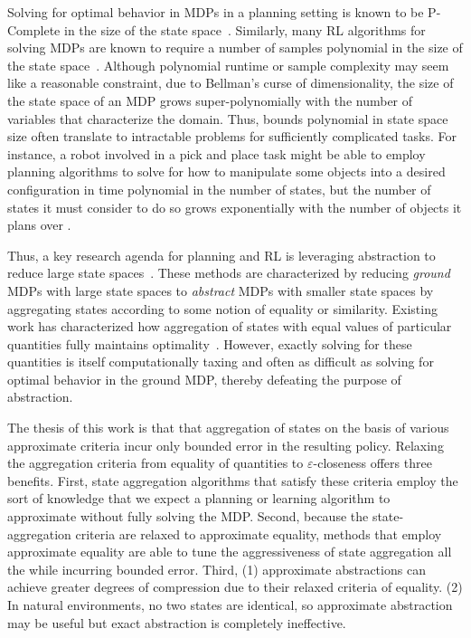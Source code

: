Solving for optimal behavior in \acp{MDP} in a planning setting is known to be P-Complete in the size of the state space~\cite{papadimitriou1987complexity,littman1995complexity}. Similarly, many \ac{RL} algorithms for solving \acp{MDP} are known to require a number of samples polynomial in the size of the state space~\cite{strehl2009reinforcement}. Although polynomial runtime or sample complexity may seem like a reasonable constraint, due to Bellman's curse of dimensionality, the size of the state space of an \ac{MDP} grows super-polynomially with the number of variables that characterize the domain. Thus, bounds polynomial in state space size often translate to intractable problems for sufficiently complicated tasks.  For instance, a robot involved in a pick and place task might be able to employ planning algorithms to solve for how to manipulate some objects into a desired configuration in time polynomial in the number of states, but the number of states it must consider to do so grows exponentially with the number of objects it plans over .

Thus, a key research agenda for planning and \ac{RL} is leveraging abstraction to reduce large state spaces~\cite{andre2002state,jong2005state,dietterich2000hierarchical,Bean2011}. These methods are characterized by reducing \textit{ground} MDPs with large state spaces to \textit{abstract} MDPs with smaller state spaces by aggregating states according to some notion of equality or similarity. Existing work has characterized how aggregation of states with equal values of particular quantities fully maintains optimality~\cite{li2006towards,dean1997modelmin}. However, exactly solving for these quantities is itself computationally taxing and often as difficult as solving for optimal behavior in the ground \ac{MDP}, thereby defeating the purpose of abstraction.

The thesis of this work is that that aggregation of states on the basis of various approximate criteria incur only bounded error in the resulting policy. Relaxing the aggregation criteria from equality of quantities to $\varepsilon$-closeness offers three benefits. First, state aggregation algorithms that satisfy these criteria employ the sort of knowledge that we expect a planning or learning algorithm to approximate without fully solving the \ac{MDP}. Second, because the state-aggregation criteria are relaxed to approximate equality, methods that employ approximate equality are able to tune the aggressiveness of state aggregation all the while incurring bounded error.
Third, (1) approximate abstractions can achieve greater degrees of compression due to their relaxed criteria of equality. (2) In natural environments, no two states are identical, so approximate abstraction may be useful but exact abstraction is completely ineffective.


